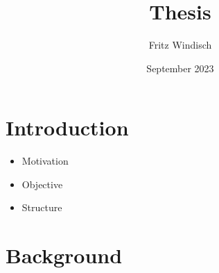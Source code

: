 \documentclass{article}
\title{Thesis}
\author{Fritz Windisch}
\date{September 2023}
\begin{document}
\maketitle

\section{Introduction}
\begin{itemize}
    \item Motivation
    \item Objective
    \item Structure
\end{itemize}

\section{Background}
\iffalse
\end{document}
